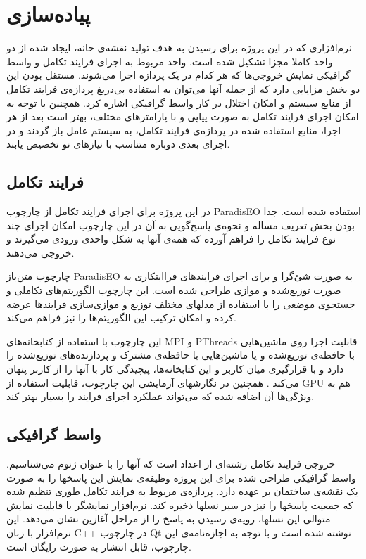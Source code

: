 \documentclass{report}
\begin{document}
\section{پیاده‌سازی}
نرم‌افزاری که در این پروژه برای رسیدن به هدف تولید نقشه‌ی خانه، ایجاد شده از دو واحد کاملا مجزا تشکیل شده است. واحد مربوط به اجرای فرایند تکامل و واسط گرافیکی نمایش خروجی‌ها که هر کدام در یک پردازه اجرا می‌شوند. مستقل بودن این دو بخش مزایایی دارد که از جمله آنها می‌توان به استفاده بی‌دریغ پردازه‌ی فرایند تکامل از منابع سیستم و امکان اختلال در کار واسط گرافیکی اشاره کرد. همچنین با توجه به امکان اجرای فرایند تکامل به صورت پیاپی و با پارامترهای مختلف، بهتر است بعد از هر اجرا، منابع استفاده شده در پردازه‌ی فرایند تکامل، به سیستم عامل باز گردند و در اجرای بعدی دوباره متناسب با نیازهای نو تخصیص یابند.

\subsection{فرایند تکامل}
در این پروژه برای اجرای فرایند تکامل از چارچوب ParadisEO استفاده شده است. جدا بودن بخش تعریف مساله و نحوه‌ی پاسخ‌گویی به آن در این چارچوب امکان اجرای چند نوع فرایند تکامل را فراهم آورده که همه‌ی آنها به شکل واحدی ورودی می‌گیرند و خروجی می‌دهند.

چارچوب متن‌باز ParadisEO به صورت شئ‌گرا و برای اجرای فرایندهای فراابتکاری به صورت توزیع‌شده و موازی طراحی شده است. این چارچوب الگوریتم‌های تکاملی و جستجوی موضعی را با استفاده از مدلهای مختلف توزیع و موازی‌سازی فرایندها عرضه کرده و امکان ترکیب این الگوریتم‌ها را نیز فراهم می‌کند.

این چارچوب با استفاده از کتابخانه‌های MPI و PThreads قابلیت اجرا روی ماشین‌هایی با حافظه‌ی توزیع‌شده و یا ماشین‌هایی با حافظه‌ی مشترک و پردازنده‌های توزیع‌شده را دارد و با قرارگیری میان کاربر و این کتابخانه‌ها، پیچیدگی کار با آنها را از کاربر پنهان می‌کند \cite{cahon_paradiseo}. همچنین در نگارشهای آزمایشی این چارچوب، قابلیت استفاده از GPU هم به ویژگی‌ها آن اضافه شده که می‌تواند عملکرد اجرای فرایند را بسیار بهتر کند.
 
\subsection{واسط گرافیکی}
خروجی فرایند تکامل رشته‌ای از اعداد است که آنها را با عنوان ژنوم می‌شناسیم. واسط گرافیکی طراحی شده برای این پروژه وظیفه‌ی نمایش این پاسخها را به صورت یک نقشه‌ی ساختمان بر عهده دارد. پردازه‌ی مربوط به فرایند تکامل طوری تنظیم شده که جمعیت پاسخها را نیز در سیر نسلها ذخیره کند. نرم‌افزار نمایشگر با قابلیت نمایش متوالی این نسلها، رویه‌ی رسیدن به پاسخ را از مراحل آغازین نشان می‌دهد. این نرم‌افزار با زبان C++ در چارچوب Qt نوشته شده است و با توجه به اجازه‌نامه‌ی این چارچوب، قابل انتشار به صورت رایگان است.
\end{document}
